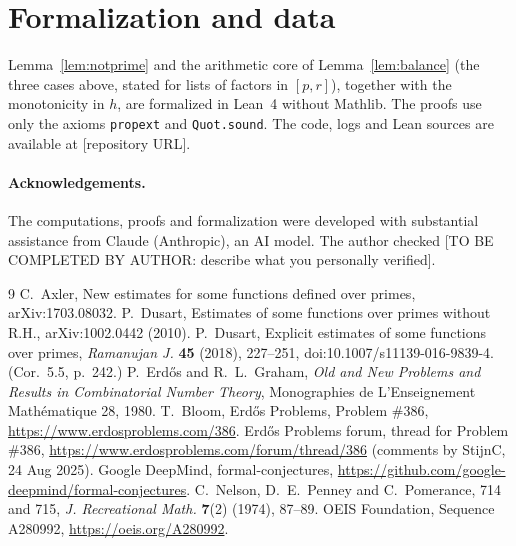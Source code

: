 \documentclass[11pt]{article}
\theoremstyle{remark}
\begin{document}
\section{Formalization and data}

Lemma~\ref{lem:notprime} and the arithmetic core of Lemma~\ref{lem:balance} (the three
cases above, stated for lists of factors in $[p,r]$), together with the monotonicity in
$h$, are formalized in Lean~4 without Mathlib. The proofs use only the axioms
\texttt{propext} and \texttt{Quot.sound}. The code, logs and Lean sources are available at
[repository URL].

\paragraph{Acknowledgements.} The computations, proofs and formalization were developed with
substantial assistance from Claude (Anthropic), an AI model. The author checked [TO BE
COMPLETED BY AUTHOR: describe what you personally verified].

\begin{thebibliography}{9}
 C.~Axler, New estimates for some functions defined over primes,
  arXiv:1703.08032.
 P.~Dusart, Estimates of some functions over primes without R.H.,
  arXiv:1002.0442 (2010).
 P.~Dusart, Explicit estimates of some functions over primes,
  \emph{Ramanujan J.} \textbf{45} (2018), 227--251, doi:10.1007/s11139-016-9839-4.
  (Cor.~5.5, p.~242.)
 P.~Erd\H{o}s and R.~L.~Graham, \emph{Old and New Problems and Results in
  Combinatorial Number Theory}, Monographies de L'Enseignement Math\'ematique 28, 1980.
 T.~Bloom, Erd\H{o}s Problems, Problem \#386,
  \url{https://www.erdosproblems.com/386}.
 Erd\H{o}s Problems forum, thread for Problem \#386,
  \url{https://www.erdosproblems.com/forum/thread/386} (comments by StijnC, 24 Aug 2025).
 Google DeepMind, formal-conjectures,
  \url{https://github.com/google-deepmind/formal-conjectures}.
 C.~Nelson, D.~E.~Penney and C.~Pomerance, 714 and 715,
  \emph{J. Recreational Math.} \textbf{7}(2) (1974), 87--89.
 OEIS Foundation, Sequence A280992, \url{https://oeis.org/A280992}.
\end{thebibliography}
\end{document}

